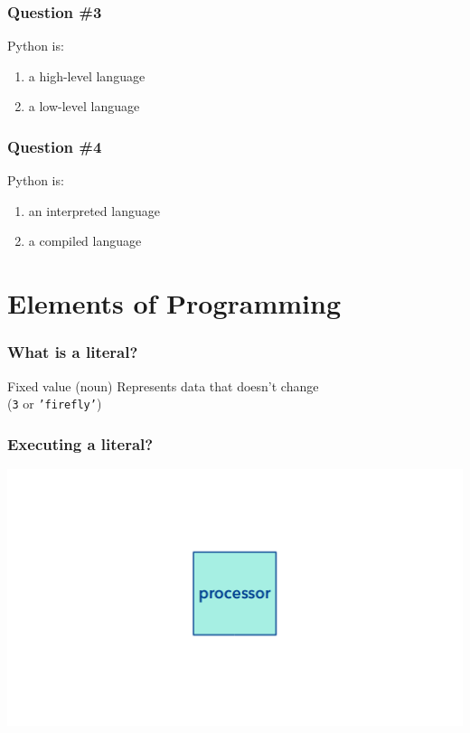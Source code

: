 \documentclass[11pt]{beamer}
\begin{document}
\begin{frame}
  \frametitle{Question \#3}
  \Enlarge

  Python is:
  \begin{enumerate}[label=\Alph*]
  \item  a high-level language
  \item  a low-level language
  \end{enumerate}
\end{frame}

\begin{frame}
  \frametitle{Question \#4}
  \Enlarge

  Python is:
  \begin{enumerate}[label=\Alph*]
  \item  an interpreted language
  \item  a compiled language
  \end{enumerate}
\end{frame}

\section{Elements of Programming}

\begin{frame}
  \frametitle{What is a \textbf{literal}?}
  \Enlarge

  \begin{itemize}
  \myitem  Fixed value (noun)
  \myitem  Represents data that doesn't change \\ (\texttt{3} or \texttt{'firefly'})
  \end{itemize}
\end{frame}

\begin{frame}
  \frametitle{Executing a literal?}
  \includegraphics[width=\textwidth]{./img/computer.png}
\end{frame}
\end{document}
